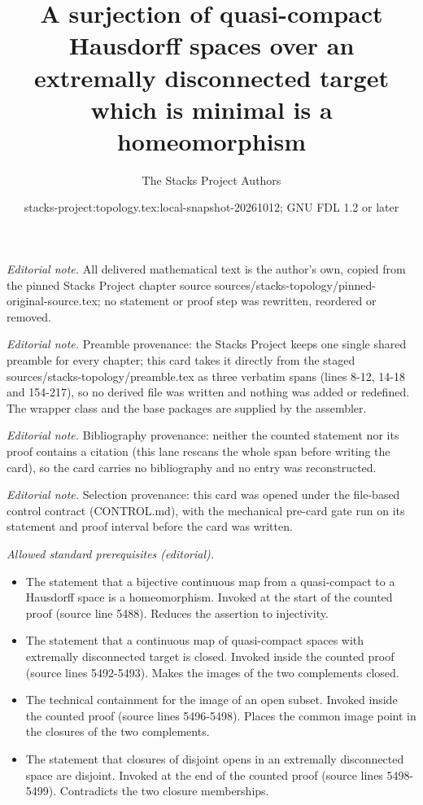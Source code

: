 \documentclass[10pt,a4paper]{amsart}
\title{A surjection of quasi-compact Hausdorff spaces over an extremally disconnected target which is minimal is a homeomorphism}
\author{The Stacks Project Authors}
\date{stacks-project:topology.tex:local-snapshot-20261012; GNU FDL 1.2 or later}
\theoremstyle{plain}
\theoremstyle{definition}
\theoremstyle{remark}
\numberwithin{equation}{subsection}
\begin{document}
\maketitle
\noindent\textit{Editorial note.} All delivered mathematical text is the author's own, copied from the pinned Stacks Project chapter source sources/stacks-topology/pinned-original-source.tex; no statement or proof step was rewritten, reordered or removed.\par\medskip
\noindent\textit{Editorial note.} Preamble provenance: the Stacks Project keeps one single shared preamble for every chapter; this card takes it directly from the staged sources/stacks-topology/preamble.tex as three verbatim spans (lines 8-12, 14-18 and 154-217), so no derived file was written and nothing was added or redefined. The wrapper class and the base packages are supplied by the assembler.\par\medskip
\noindent\textit{Editorial note.} Bibliography provenance: neither the counted statement nor its proof contains a citation (this lane rescans the whole span before writing the card), so the card carries no bibliography and no entry was reconstructed.\par\medskip
\noindent\textit{Editorial note.} Selection provenance: this card was opened under the file-based control contract (CONTROL.md), with the mechanical pre-card gate run on its statement and proof interval before the card was written.\par\medskip
\noindent\textit{Allowed standard prerequisites (editorial).}\begin{itemize}
\item The statement that a bijective continuous map from a quasi-compact to a Hausdorff space is a homeomorphism. Invoked at the start of the counted proof (source line 5488). Reduces the assertion to injectivity.
\item The statement that a continuous map of quasi-compact spaces with extremally disconnected target is closed. Invoked inside the counted proof (source lines 5492-5493). Makes the images of the two complements closed.
\item The technical containment for the image of an open subset. Invoked inside the counted proof (source lines 5496-5498). Places the common image point in the closures of the two complements.
\item The statement that closures of disjoint opens in an extremally disconnected space are disjoint. Invoked at the end of the counted proof (source lines 5498-5499). Contradicts the two closure memberships.
\end{itemize}\medskip
\end{document}
